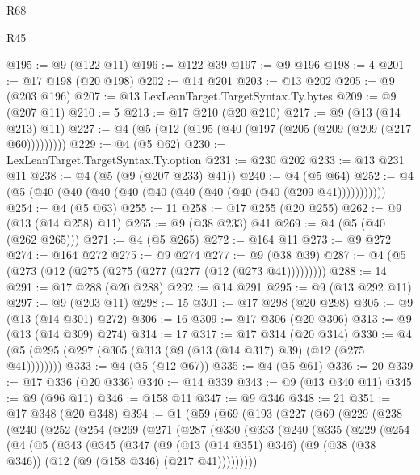 \begin{lexlean}{R68}
\begin{lexlean}{R45}
\begin{coremodule}
{{{{{{{{{{{{{{{{{{{{{{{{{{{{{{{{{{{{{{{{{{{{{{{{{{{{{{{{{{{{{{{{{{{{{{{{{{{{{{{{{{{{{{{{{{{@195 := @9 (@122 @11)
@196 := @122 @39
@197 := @9 @196
@198 := 4
@201 := @17 @198 (@20 @198)
@202 := @14 @201
@203 := @13 @202
@205 := @9 (@203 @196)
@207 := @13 LexLeanTarget.TargetSyntax.Ty.bytes
@209 := @9 (@207 @11)
@210 := 5
@213 := @17 @210 (@20 @210)
@217 := @9 (@13 (@14 @213) @11)
@227 := @4 (@5 (@12 (@195 (@40 (@197 (@205 (@209 (@209 (@217 @60)))))))))
@229 := @4 (@5 @62)
@230 := LexLeanTarget.TargetSyntax.Ty.option
@231 := @230 @202
@233 := @13 @231 @11
@238 := @4 (@5 (@9 (@207 @233) @41))
@240 := @4 (@5 @64)
@252 := @4 (@5 (@40 (@40 (@40 (@40 (@40 (@40 (@40 (@40 (@40 (@209 @41)))))))))))
@254 := @4 (@5 @63)
@255 := 11
@258 := @17 @255 (@20 @255)
@262 := @9 (@13 (@14 @258) @11)
@265 := @9 (@38 @233) @41
@269 := @4 (@5 (@40 (@262 @265)))
@271 := @4 (@5 @265)
@272 := @164 @11
@273 := @9 @272
@274 := @164 @272
@275 := @9 @274
@277 := @9 (@38 @39)
@287 := @4 (@5 (@273 (@12 (@275 (@275 (@277 (@277 (@12 (@273 @41)))))))))
@288 := 14
@291 := @17 @288 (@20 @288)
@292 := @14 @291
@295 := @9 (@13 @292 @11)
@297 := @9 (@203 @11)
@298 := 15
@301 := @17 @298 (@20 @298)
@305 := @9 (@13 (@14 @301) @272)
@306 := 16
@309 := @17 @306 (@20 @306)
@313 := @9 (@13 (@14 @309) @274)
@314 := 17
@317 := @17 @314 (@20 @314)
@330 := @4 (@5 (@295 (@297 (@305 (@313 (@9 (@13 (@14 @317) @39) (@12 (@275 @41))))))))
@333 := @4 (@5 (@12 @67))
@335 := @4 (@5 @61)
@336 := 20
@339 := @17 @336 (@20 @336)
@340 := @14 @339
@343 := @9 (@13 @340 @11)
@345 := @9 (@96 @11)
@346 := @158 @11
@347 := @9 @346
@348 := 21
@351 := @17 @348 (@20 @348)
@394 := @1
    (@59
      (@69
        (@193
          (@227
            (@69
              (@229
                (@238
                  (@240
                    (@252
                      (@254
                        (@269
                          (@271
                            (@287
                              (@330
                                (@333
                                  (@240
                                    (@335
                                      (@229
                                        (@254
                                          (@4
                                            (@5
                                              (@343
                                                (@345
                                                  (@347
                                                    (@9
                                                      (@13 (@14 @351) @346)
                                                      (@9
                                                        (@38 (@38 @346))
                                                        (@12 (@9 (@158 @346) (@217 @41)))))))))
}}}}}}}}}}}}}}}}}}}}}}}}}}}}}}}}}}}}}}}}}}}}}}}}}}}}}}}}}}}}}}}}}}}}}}}}}}}}}}}}}}}}}}}}}}}
\end{coremodule}
\end{lexlean}
\end{lexlean}
